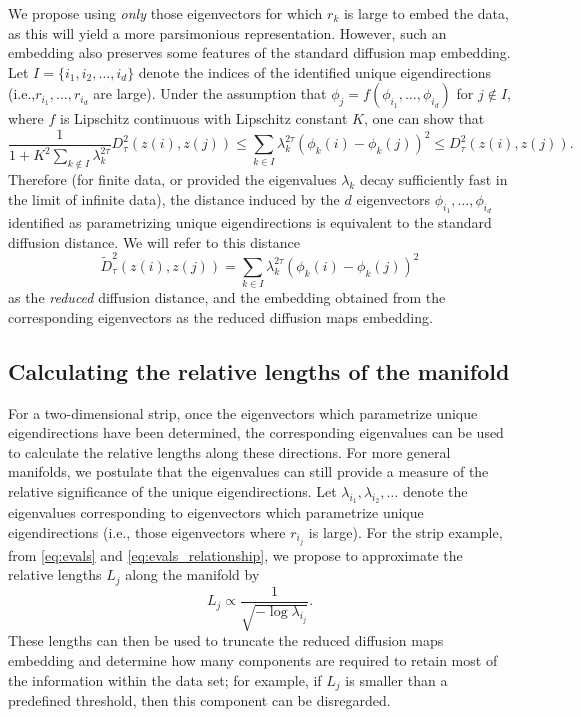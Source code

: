 We propose using {\em only} those eigenvectors for which $r_k$ is large to embed the data, as this will yield a more parsimonious representation.
%
However, such an embedding also preserves some features of the standard diffusion map embedding.
%
Let $I = \{i_1, i_2, \dots, i_d \}$ denote the indices of the identified unique eigendirections (i.e.,$r_{i_1}, \dots, r_{i_d}$ are large).
%
Under the assumption that $\phi_j = f \left( \phi_{i_1}, \dots, \phi_{i_d} \right)$ for $j \not\in I$, where $f$ is Lipschitz continuous with Lipschitz constant $K$, one can show that
\begin{equation}
\frac{1}{1+K^2 \sum_{k \not\in I} \lambda_k^{2\tau}} D^2_\tau(z(i), z(j)) \le \sum_{k \in I} \lambda_k^{2 \tau} \left( \phi_k(i) - \phi_k(j)  \right)^2 \le D^2_\tau(z(i), z(j)).
\end{equation}
%
Therefore (for finite data, or provided the eigenvalues $\lambda_k$ decay sufficiently fast in the limit of infinite data), the distance induced by the $d$ eigenvectors $\phi_{i_1}, \dots, \phi_{i_d}$ identified as parametrizing unique eigendirections is equivalent to the standard diffusion distance.
%
We will refer to this distance
\begin{equation}
\tilde{D}^2_\tau(z(i), z(j)) = \sum_{k \in I} \lambda_k^{2 \tau} \left( \phi_k(i) - \phi_k(j)  \right)^2
\end{equation}
%
as the {\em reduced} diffusion distance, and the embedding obtained from the corresponding eigenvectors as the reduced diffusion maps embedding.
%

\subsection{Calculating the relative lengths of the manifold} \label{sec:relative_lengths}

For a two-dimensional strip, once the eigenvectors which parametrize unique eigendirections have been determined, the corresponding eigenvalues can be used to calculate the relative lengths along these directions.
%
For more general manifolds, we postulate that the eigenvalues can still provide a measure of the relative significance of the unique eigendirections.
%
Let $\lambda_{i_1}, \lambda_{i_2}, \dots$ denote the eigenvalues corresponding to eigenvectors which parametrize unique eigendirections (i.e., those eigenvectors where $r_{i_j}$ is large).
%
For the strip example, from \eqref{eq:evals} and \eqref{eq:evals_relationship}, we propose to approximate the relative lengths $L_j$  along the manifold by
\begin{equation} \label{eq:est_lengths}
L_j \propto \frac{1}{\sqrt{-\log \lambda_{i_j}}}.
\end{equation}
%
These lengths can then be used to truncate the reduced diffusion maps embedding and determine how many components are required to retain most of the information within the data set;
for example, if $L_j$ is smaller than a predefined threshold, then this component can be disregarded.


